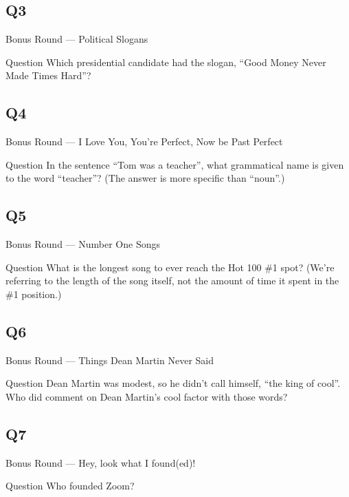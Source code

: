 \documentclass[11pt]{beamer}
\begin{document}
\subsection*{Q3}
\begin{frame}[t]{Bonus Round --- Political Slogans}
\vspace{-0.5em}
\begin{block}{Question}
Which presidential candidate had the slogan, ``Good Money Never Made Times Hard''?
\end{block}
\end{frame}
\subsection*{Q4}
\begin{frame}[t]{Bonus Round --- I Love You, You're Perfect, Now be Past Perfect}
\vspace{-0.5em}
\begin{block}{Question}
In the sentence ``Tom was a teacher'', what grammatical name is given to the word ``teacher''? (The answer is more specific than ``noun''.)
\end{block}
\end{frame}
\subsection*{Q5}
\begin{frame}[t]{Bonus Round --- Number One Songs}
\vspace{-0.5em}
\begin{block}{Question}
What is the longest song to ever reach the Hot 100 \#1 spot? (We're referring to the length of the song itself, not the amount of time it spent in the \#1 position.)
\end{block}
\end{frame}
\subsection*{Q6}
\begin{frame}[t]{Bonus Round --- Things Dean Martin Never Said}
\vspace{-0.5em}
\begin{block}{Question}
Dean Martin was modest, so he didn't call himself, ``the king of cool''. Who did comment on Dean Martin's cool factor with those words?
\end{block}
\end{frame}
\subsection*{Q7}
\begin{frame}[t]{Bonus Round --- Hey, look what I found(ed)!}
\vspace{-0.5em}
\begin{block}{Question}
Who founded Zoom?
\end{block}
\end{frame}
\end{document}
